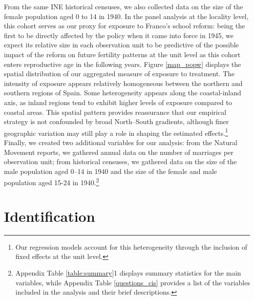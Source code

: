 \documentclass[a4paper,oneside,final,onecolumn,12pt,english]{article}
\begin{document}
From the same INE historical censuses, we also collected data on the size of the female population aged 0 to 14 in 1940. In the panel analysis at the locality level, this cohort serves as our proxy for exposure to Franco's school reform: being the first to be directly affected by the policy when it came into force in 1945, we expect its relative size in each observation unit to be predictive of the possible impact of the reform on future fertility patterns at the unit level as this cohort enters reproductive age in the following years. Figure \ref{map_popw} displays the spatial distribution of our aggregated measure of exposure to treatment. %
The intensity of exposure appears relatively homogeneous between the northern and southern regions of Spain. Some heterogeneity appears along the coastal-inland axis, as inland regions tend to exhibit higher levels of exposure compared to coastal areas. This spatial pattern provides reassurance that our empirical strategy is not confounded by broad North–South gradients, although finer geographic variation may still play a role in shaping the estimated effects.\footnote{Our regression models account for this heterogeneity through the inclusion of fixed effects at the unit level.} Finally, we created two additional variables for our analysis: from the Natural Movement reports, we gathered annual data on the number of marriages per observation unit; from historical censuses, we gathered data on the size of the male population aged 0–14 in 1940 and  the size of the female and male population aged 15-24 in 1940.\footnote{Appendix Table \ref{table:summary}1 displays summary statistics for the main variables, while Appendix Table \ref{questions_cis} provides a list of the variables included in the analysis and their brief descriptions.}








\section{Identification} \label{empirics}
\end{document}
